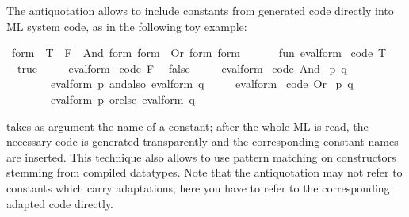\begin{isabellebody}
\isamarkuptrue%
%
\isamarkuptrue%
%
\begin{isamarkuptext}%
The  antiquotation allows to include constants from
  generated code directly into ML system code, as in the following toy
  example:%
\end{isamarkuptext}%
\isamarkuptrue%
%
\isadelimquote
%
\endisadelimquote
%
\isatagquote
{}\isamarkupfalse%
\ form\ {\isacharequal}\ T\ {\isacharbar}\ F\ {\isacharbar}\ And\ form\ form\ {\isacharbar}\ Or\ form\ form\ %
\endisatagquote
{\isafoldquote}%
%
\isadelimquote
%
\endisadelimquote
%
\isadelimquotett
\ %
\endisadelimquotett
%
\isatagquotett
{}\isamarkupfalse%
\ {\isacharverbatimopen}\isanewline
\ \ fun\ eval{\isacharunderscore}form\ %
\isaantiq
code\ T%
\endisaantiq
\ {\isacharequal}\ true\isanewline
\ \ \ \ {\isacharbar}\ eval{\isacharunderscore}form\ %
\isaantiq
code\ F%
\endisaantiq
\ {\isacharequal}\ false\isanewline
\ \ \ \ {\isacharbar}\ eval{\isacharunderscore}form\ {\isacharparenleft}%
\isaantiq
code\ And%
\endisaantiq
\ {\isacharparenleft}p{\isacharcomma}\ q{\isacharparenright}{\isacharparenright}\ {\isacharequal}\isanewline
\ \ \ \ \ \ \ \ eval{\isacharunderscore}form\ p\ andalso\ eval{\isacharunderscore}form\ q\isanewline
\ \ \ \ {\isacharbar}\ eval{\isacharunderscore}form\ {\isacharparenleft}%
\isaantiq
code\ Or%
\endisaantiq
\ {\isacharparenleft}p{\isacharcomma}\ q{\isacharparenright}{\isacharparenright}\ {\isacharequal}\isanewline
\ \ \ \ \ \ \ \ eval{\isacharunderscore}form\ p\ orelse\ eval{\isacharunderscore}form\ q{\isacharsemicolon}\isanewline
{\isacharverbatimclose}%
\endisatagquotett
{\isafoldquotett}%
%
\isadelimquotett
%
\endisadelimquotett
%
\begin{isamarkuptext}%
\noindent {} takes as argument the name of a constant;
  after the whole ML is read, the necessary code is generated
  transparently and the corresponding constant names are inserted.
  This technique also allows to use pattern matching on constructors
  stemming from compiled datatypes.  Note that the 
  antiquotation may not refer to constants which carry adaptations;
  here you have to refer to the corresponding adapted code directly.


\end{isamarkuptext}
\end{isabellebody}
